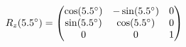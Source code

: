 \documentclass[preview]{standalone}
\begin{document}
\begin{align*}
\special{dvisvgm:raw <g id='unique000'>}R_z(5.5^\circ) = \begin{pmatrix} \cos(5.5^\circ) & -\sin(5.5^\circ) & 0 \\ \sin(5.5^\circ) & \cos(5.5^\circ) & 0 \\ 0 & 0 & 1 \end{pmatrix}\special{dvisvgm:raw </g>}
\end{align*}
\end{document}
